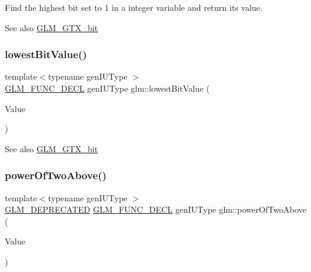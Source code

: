 Find the highest bit set to 1 in a integer variable and return its value.

\begin{DoxySeeAlso}{See also}
\hyperlink{group__gtx__bit}{G\+L\+M\+\_\+\+G\+T\+X\+\_\+bit} 
\end{DoxySeeAlso}
\mbox{\label{group__gtx__bit_ga2ff6568089f3a9b67f5c30918855fc6f}} 
\subsubsection{\texorpdfstring{lowest\+Bit\+Value()}{lowestBitValue()}}
{\footnotesize\ttfamily template$<$typename gen\+I\+U\+Type $>$ \\
\hyperlink{setup_8hpp_ab2d052de21a70539923e9bcbf6e83a51}{G\+L\+M\+\_\+\+F\+U\+N\+C\+\_\+\+D\+E\+CL} gen\+I\+U\+Type glm\+::lowest\+Bit\+Value (\begin{DoxyParamCaption}\item[{gen\+I\+U\+Type}]{Value }\end{DoxyParamCaption})}

\begin{DoxySeeAlso}{See also}
\hyperlink{group__gtx__bit}{G\+L\+M\+\_\+\+G\+T\+X\+\_\+bit} 
\end{DoxySeeAlso}
\mbox{\label{group__gtx__bit_ga8cda2459871f574a0aecbe702ac93291}} 
\subsubsection{\texorpdfstring{power\+Of\+Two\+Above()}{powerOfTwoAbove()}\hspace{0.1cm}{\footnotesize\ttfamily [1/2]}}
{\footnotesize\ttfamily template$<$typename gen\+I\+U\+Type $>$ \\
\hyperlink{setup_8hpp_a8edfb48cdc249a3ee48406bf179023dc}{G\+L\+M\+\_\+\+D\+E\+P\+R\+E\+C\+A\+T\+ED} \hyperlink{setup_8hpp_ab2d052de21a70539923e9bcbf6e83a51}{G\+L\+M\+\_\+\+F\+U\+N\+C\+\_\+\+D\+E\+CL} gen\+I\+U\+Type glm\+::power\+Of\+Two\+Above (\begin{DoxyParamCaption}\item[{gen\+I\+U\+Type}]{Value }\end{DoxyParamCaption})}

